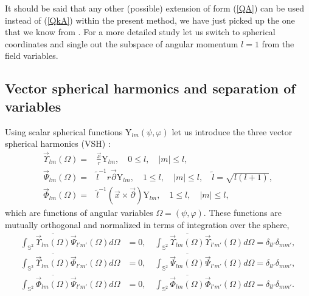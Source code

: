 \documentclass[12pt]{article}
\newcommand{\pl}{\partial}
\newcommand{\Sph}{\mathbb{S}}
\newcommand{\YY}{\mathrm{Y}}
\begin{document}
    It should be said that any other (possible) extension of form
(\ref{QA})
    can be used instead of
(\ref{QkA})
    within the present method,
    we have just picked up the one that we know from
\cite{Inv}.
    For a more detailed study let us switch to spherical coordinates
    and single out the subspace of angular momentum
$ l=1 $
    from the field variables.



\subsection{Vector spherical harmonics and separation
	    of variables}
	Using  scalar spherical functions
$ \YY_{lm}(\psi,\varphi) $
	let us introduce the three vector spherical harmonics (VSH)
\cite{VSH}:
\begin{align*}
    \vec{\Upsilon}_{lm}(\Omega) = & \frac{\vec{x}}{r} \YY_{lm} , \quad
        0 \leq l, \quad |m| \leq l, \\
    \vec{\Psi}_{lm}(\Omega) = & \tilde{l}^{-1} r \vec{\pl} \YY_{lm} , \quad
        1 \leq l , \quad |m| \leq l, \quad \tilde{l} = \sqrt{l(l+1)},\\
    \vec{\Phi}_{lm}(\Omega)
	= & \tilde{l}^{-1} (\vec{x} \times \vec{\pl}) \YY_{lm},
        \quad 1 \leq l , \quad |m| \leq l ,
\end{align*}
	which are functions of angular variables
$ \Omega = (\psi,\varphi) $.
	These functions are mutually orthogonal and normalized
    in terms of integration over the sphere,
\begin{align*}
    \int_{\Sph^{2}} \overline{\vec{\Upsilon}_{lm}(\Omega)}
        \vec{\Psi}_{l'm'}(\Omega) d\Omega & = 0 ,\quad
    \int_{\Sph^{2}} \overline{\vec{\Upsilon}_{lm}(\Omega)}
        \vec{\Upsilon}_{l'm'}(\Omega) d\Omega = \delta_{ll'} \delta_{mm'} , \\
    \int_{\Sph^{2}} \overline{\vec{\Upsilon}_{lm}(\Omega)}
        \vec{\Phi}_{l'm'}(\Omega) d\Omega       & = 0 ,\quad
    \int_{\Sph^{2}} \overline{\vec{\Psi}_{lm}(\Omega)}
        \vec{\Psi}_{l'm'}(\Omega) d\Omega = \delta_{ll'} \delta_{mm'} , \\
    \int_{\Sph^{2}} \overline{\vec{\Phi}_{lm}(\Omega)}
        \vec{\Psi}_{l'm'}(\Omega) d\Omega & = 0 ,\quad
    \int_{\Sph^{2}} \overline{\vec{\Phi}_{lm}(\Omega)}
        \vec{\Phi}_{l'm'}(\Omega) d\Omega = \delta_{ll'} \delta_{mm'} .
\end{align*}
\end{document}
